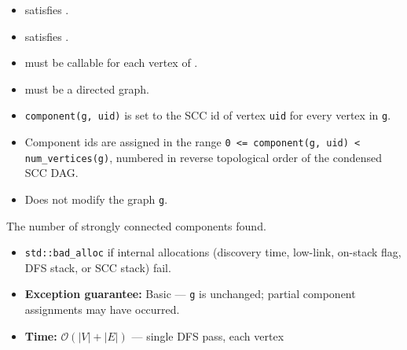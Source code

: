 \begin{itemdescr}
      \pnum\mandates
            \begin{itemize}
                  \item {} satisfies .
                  \item {} satisfies .
            \end{itemize}
      \pnum\preconditions
            \begin{itemize}
                  \item {} must be callable for each vertex of .
            \end{itemize}
      \pnum\hardprecond
            \begin{itemize}
                  \item {} must be a directed graph.
            \end{itemize}
      \pnum\effects
            \begin{itemize}
                  \item \lstinline{component(g, uid)} is set to the SCC id of vertex \lstinline{uid}
                        for every vertex in \lstinline{g}.
                  \item Component ids are assigned in the range
                        \lstinline{0 <= component(g, uid) < num_vertices(g)}, numbered in
                        reverse topological order of the condensed SCC DAG.
                  \item Does not modify the graph \lstinline{g}.
            \end{itemize}
      \pnum\returns The number of strongly connected components found.
      \pnum\throws
            \begin{itemize}
                  \item \lstinline{std::bad_alloc} if internal allocations (discovery time, low-link,
                        on-stack flag, DFS stack, or SCC stack) fail.
                  \item \textbf{Exception guarantee:} Basic --- \lstinline{g} is unchanged;
                        partial component assignments may have occurred.
            \end{itemize}
      \pnum\complexity
            \begin{itemize}
                  \item \textbf{Time:} $\mathcal{O}(|V|+|E|)$ --- single DFS pass, each vertex

\end{itemize}
\end{itemdescr}
